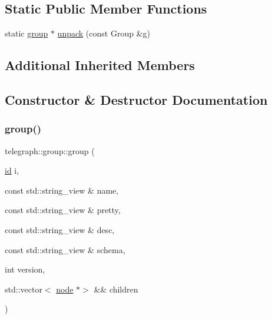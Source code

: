 \subsection*{Static Public Member Functions}
\begin{DoxyCompactItemize}
\item 
static \hyperlink{classtelegraph_1_1group}{group} $\ast$ \hyperlink{classtelegraph_1_1group_a92934fab7dc94207f4d98a40deef0f55}{unpack} (const Group \&g)
\end{DoxyCompactItemize}
\subsection*{Additional Inherited Members}


\subsection{Constructor \& Destructor Documentation}
\mbox{\label{classtelegraph_1_1group_a06ec96e471690fcc8e9cc6efe1632261}} 
\subsubsection{\texorpdfstring{group()}{group()}\hspace{0.1cm}{\footnotesize\ttfamily [1/2]}}
{\footnotesize\ttfamily telegraph\+::group\+::group (\begin{DoxyParamCaption}\item[{\hyperlink{classtelegraph_1_1node_a90bc576d668ed141d5354a06aa9c8d9a}{id}}]{i,  }\item[{const std\+::string\+\_\+view \&}]{name,  }\item[{const std\+::string\+\_\+view \&}]{pretty,  }\item[{const std\+::string\+\_\+view \&}]{desc,  }\item[{const std\+::string\+\_\+view \&}]{schema,  }\item[{int}]{version,  }\item[{std\+::vector$<$ \hyperlink{classtelegraph_1_1node}{node} $\ast$$>$ \&\&}]{children }\end{DoxyParamCaption})\hspace{0.3cm}{\ttfamily [inline]}}

\mbox{\label{classtelegraph_1_1group_a88d584b6dc7383e319a00fc266b29be7}} 
